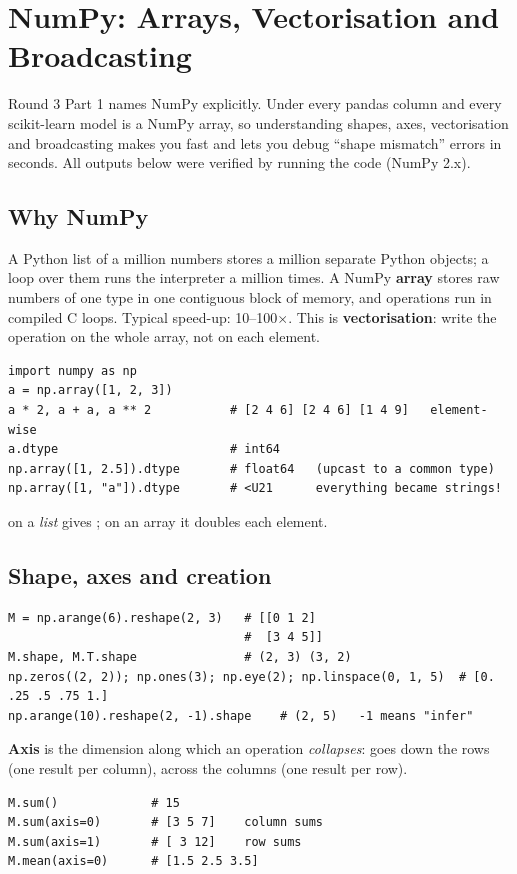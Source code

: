 \chapter{NumPy: Arrays, Vectorisation and Broadcasting}

Round 3 Part 1 names NumPy explicitly. Under every pandas column and every scikit-learn model is a NumPy array, so understanding
shapes, axes, vectorisation and broadcasting makes you fast and lets you debug ``shape mismatch'' errors in seconds. All outputs below
were verified by running the code (NumPy 2.x).

\section{Why NumPy}
A Python list of a million numbers stores a million separate Python objects; a loop over them runs the interpreter a million times.
A NumPy \textbf{array} stores raw numbers of one type in one contiguous block of memory, and operations run in compiled C loops.
Typical speed-up: 10--100$\times$. This is \textbf{vectorisation}: write the operation on the whole array, not on each element.
\begin{lstlisting}
import numpy as np
a = np.array([1, 2, 3])
a * 2, a + a, a ** 2           # [2 4 6] [2 4 6] [1 4 9]   element-wise
a.dtype                        # int64
np.array([1, 2.5]).dtype       # float64   (upcast to a common type)
np.array([1, "a"]).dtype       # <U21      everything became strings!
\end{lstlisting}
 on a \emph{list} gives \code{[1, 2, 3, 1, 2, 3]}; on an array it doubles each element.

\section{Shape, axes and creation}
\begin{lstlisting}
M = np.arange(6).reshape(2, 3)   # [[0 1 2]
                                 #  [3 4 5]]
M.shape, M.T.shape               # (2, 3) (3, 2)
np.zeros((2, 2)); np.ones(3); np.eye(2); np.linspace(0, 1, 5)  # [0. .25 .5 .75 1.]
np.arange(10).reshape(2, -1).shape    # (2, 5)   -1 means "infer"
\end{lstlisting}
\textbf{Axis} is the dimension along which an operation \emph{collapses}:  goes down the rows (one result per column),  across the columns (one result
per row).
\begin{lstlisting}
M.sum()             # 15
M.sum(axis=0)       # [3 5 7]    column sums
M.sum(axis=1)       # [ 3 12]    row sums
M.mean(axis=0)      # [1.5 2.5 3.5]
\end{lstlisting}

